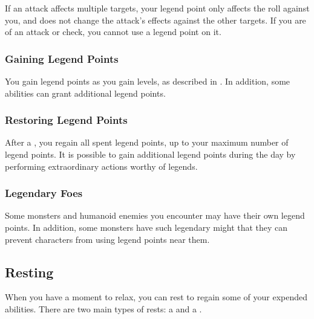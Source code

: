             If an attack affects multiple targets, your legend point only affects the roll against you, and does not change the attack's effects against the other targets.
            If you are  of an attack or check, you cannot use a legend point on it.

        \subsubsection{Gaining Legend Points}

            You gain legend points as you gain levels, as described in .
            In addition, some abilities can grant additional legend points.

        \subsubsection{Restoring Legend Points}

            After a , you regain all spent legend points, up to your maximum number of legend points.
            It is possible to gain additional legend points during the day by performing extraordinary actions worthy of legends.

        \subsubsection{Legendary Foes}
            Some monsters and humanoid enemies you encounter may have their own legend points.
            In addition, some monsters have such legendary might that they can prevent characters from using legend points near them.

    \subsection{Resting}
        When you have a moment to relax, you can rest to regain some of your expended abilities.
        There are two main types of rests: a  and a .

